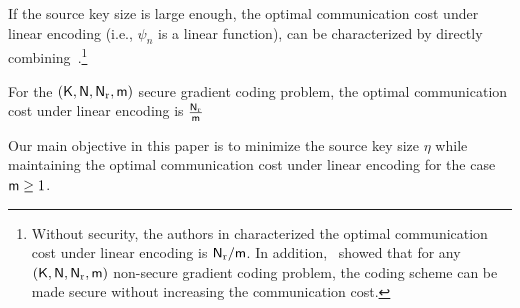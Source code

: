 \documentclass[conference,letterpaper]{IEEEtran}
\begin{document}
If the source key size is large enough, the optimal communication cost under linear encoding (i.e., $ \psi_n$ is a  linear function), can be  characterized by  directly combining~\cite{wan2022secure,ye2018communication}.\footnote{\label{foot:direct optimal}Without  security, the authors in \cite{ye2018communication} characterized  the optimal communication cost  under linear encoding  is ${\sf N}_{\rm r}/{\sf m}$. In addition,~\cite[Theorem 1]{wan2022secure} showed that for any $({\sf K}, {\sf N}, {\sf N}_{\rm r}, {\sf m})$ non-secure gradient coding problem, the coding scheme can be made secure without increasing the communication cost.} 
\begin{thm}
\label{thm:communication cost}
For the  $({\sf K},{\sf N},{\sf N}_{\rm r}, {\sf m})$ secure gradient coding problem, the optimal communication cost under linear encoding is 
$ \frac{{\sf N}_{\rm r}}{{\sf m}}$
\end{thm}



Our main objective in this paper is to minimize the source key size $\eta$ while maintaining the optimal communication cost under linear encoding  for the case $ {\sf m} \geq 1$.

\end{document}
